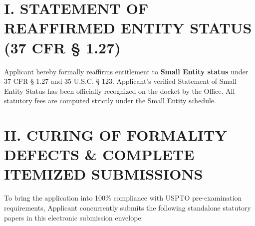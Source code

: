 \documentclass[11pt,letterpaper]{article}
\begin{document}
\section*{I. STATEMENT OF REAFFIRMED ENTITY STATUS (37 CFR \S{} 1.27)}

Applicant hereby formally reaffirms entitlement to \textbf{Small Entity status} under 37 CFR \S{} 1.27 and 35 U.S.C. \S{} 123. Applicant's verified Statement of Small Entity Status has been officially recognized on the docket by the Office. All statutory fees are computed strictly under the Small Entity schedule.

\section*{II. CURING OF FORMALITY DEFECTS \& COMPLETE ITEMIZED SUBMISSIONS}

To bring the application into 100\% compliance with USPTO pre-examination requirements, Applicant concurrently submits the following standalone statutory papers in this electronic submission envelope:
\end{document}
